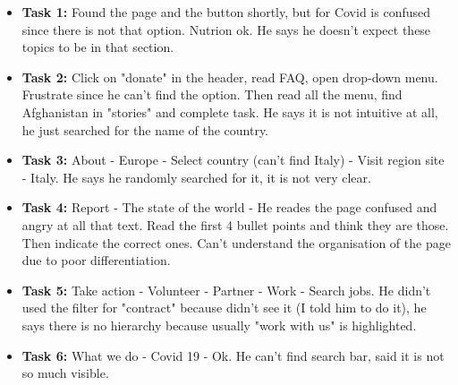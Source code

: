\begin{itemize}
	\item \textbf{Task 1:} Found the page and the button shortly, but for Covid is confused since there is not that option. Nutrion ok. He says he doesn't expect these topics to be in that section.
	\item \textbf{Task 2:} Click on "donate" in the header, read FAQ, open drop-down menu. Frustrate since he can't find the option. Then read all the menu, find Afghanistan in "stories" and complete task. He says it is not intuitive at all, he just searched for the name of the country.
	\item \textbf{Task 3:} About - Europe - Select country (can't find Italy) - Visit region site - Italy. He says he randomly searched for it, it is not very clear.
	\item \textbf{Task 4:} Report - The state of the world - He reades the page confused and angry at all that text. Read the first 4 bullet points and think they are those. Then indicate the correct ones. Can't understand the organisation of the page due to poor differentiation.
	\item \textbf{Task 5:} Take action - Volunteer - Partner - Work - Search jobs. He didn't used the filter for "contract" because didn't see it (I told him to do it), he says there is no hierarchy because usually "work with us" is highlighted.
	\item \textbf{Task 6:} What we do - Covid 19 - Ok. He can't find search bar, said it is not so much visible.
\end{itemize}


\vspace{1cm}

